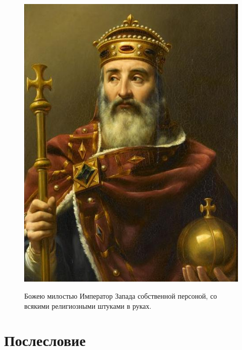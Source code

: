 \begin{figure}[h!tb]
	\centering\includegraphics[scale=0.4]{Relig_gambit/1572932654149633403.png}
	\label{fig:gambit14} %
	\caption{Божею милостью Император Запада собственной персоной, со всякими религиозными штуками в руках. 	}
\end{figure}

\section{Послесловие}

